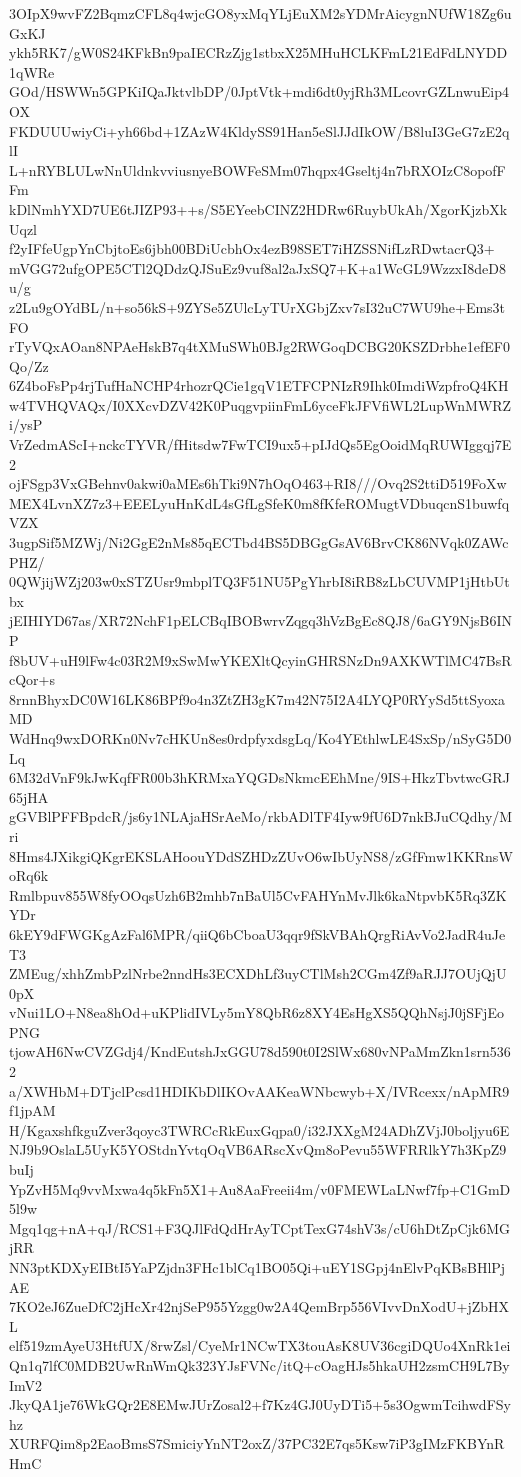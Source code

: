 3OIpX9wvFZ2BqmzCFL8q4wjcGO8yxMqYLjEuXM2sYDMrAicygnNUfW18Zg6uGxKJ
ykh5RK7/gW0S24KFkBn9paIECRzZjg1stbxX25MHuHCLKFmL21EdFdLNYDD1qWRe
GOd/HSWWn5GPKiIQaJktvlbDP/0JptVtk+mdi6dt0yjRh3MLcovrGZLnwuEip4OX
FKDUUUwiyCi+yh66bd+1ZAzW4KldySS91Han5eSlJJdIkOW/B8luI3GeG7zE2qlI
L+nRYBLULwNnUldnkvviusnyeBOWFeSMm07hqpx4Gseltj4n7bRXOIzC8opofFFm
kDlNmhYXD7UE6tJIZP93++s/S5EYeebCINZ2HDRw6RuybUkAh/XgorKjzbXkUqzl
f2yIFfeUgpYnCbjtoEs6jbh00BDiUcbhOx4ezB98SET7iHZSSNifLzRDwtacrQ3+
mVGG72ufgOPE5CTl2QDdzQJSuEz9vuf8al2aJxSQ7+K+a1WcGL9WzzxI8deD8u/g
z2Lu9gOYdBL/n+so56kS+9ZYSe5ZUlcLyTUrXGbjZxv7sI32uC7WU9he+Ems3tFO
rTyVQxAOan8NPAeHskB7q4tXMuSWh0BJg2RWGoqDCBG20KSZDrbhe1efEF0Qo/Zz
6Z4boFsPp4rjTufHaNCHP4rhozrQCie1gqV1ETFCPNIzR9Ihk0ImdiWzpfroQ4KH
w4TVHQVAQx/I0XXcvDZV42K0PuqgvpiinFmL6yceFkJFVfiWL2LupWnMWRZi/ysP
VrZedmAScI+nckcTYVR/fHitsdw7FwTCI9ux5+pIJdQs5EgOoidMqRUWIggqj7E2
ojFSgp3VxGBehnv0akwi0aMEs6hTki9N7hOqO463+RI8///Ovq2S2ttiD519FoXw
MEX4LvnXZ7z3+EEELyuHnKdL4sGfLgSfeK0m8fKfeROMugtVDbuqcnS1buwfqVZX
3ugpSif5MZWj/Ni2GgE2nMs85qECTbd4BS5DBGgGsAV6BrvCK86NVqk0ZAWcPHZ/
0QWjijWZj203w0xSTZUsr9mbplTQ3F51NU5PgYhrbI8iRB8zLbCUVMP1jHtbUtbx
jEIHIYD67as/XR72NchF1pELCBqIBOBwrvZqgq3hVzBgEc8QJ8/6aGY9NjsB6INP
f8bUV+uH9lFw4c03R2M9xSwMwYKEXltQcyinGHRSNzDn9AXKWTlMC47BsRcQor+s
8rnnBhyxDC0W16LK86BPf9o4n3ZtZH3gK7m42N75I2A4LYQP0RYySd5ttSyoxaMD
WdHnq9wxDORKn0Nv7cHKUn8es0rdpfyxdsgLq/Ko4YEthlwLE4SxSp/nSyG5D0Lq
6M32dVnF9kJwKqfFR00b3hKRMxaYQGDsNkmcEEhMne/9IS+HkzTbvtwcGRJ65jHA
gGVBlPFFBpdcR/js6y1NLAjaHSrAeMo/rkbADlTF4Iyw9fU6D7nkBJuCQdhy/Mri
8Hms4JXikgiQKgrEKSLAHoouYDdSZHDzZUvO6wIbUyNS8/zGfFmw1KKRnsWoRq6k
Rmlbpuv855W8fyOOqsUzh6B2mhb7nBaUl5CvFAHYnMvJlk6kaNtpvbK5Rq3ZKYDr
6kEY9dFWGKgAzFal6MPR/qiiQ6bCboaU3qqr9fSkVBAhQrgRiAvVo2JadR4uJeT3
ZMEug/xhhZmbPzlNrbe2nndHs3ECXDhLf3uyCTlMsh2CGm4Zf9aRJJ7OUjQjU0pX
vNui1LO+N8ea8hOd+uKPlidIVLy5mY8QbR6z8XY4EsHgXS5QQhNsjJ0jSFjEoPNG
tjowAH6NwCVZGdj4/KndEutshJxGGU78d590t0I2SlWx680vNPaMmZkn1srn5362
a/XWHbM+DTjclPcsd1HDIKbDlIKOvAAKeaWNbcwyb+X/IVRcexx/nApMR9f1jpAM
H/KgaxshfkguZver3qoyc3TWRCcRkEuxGqpa0/i32JXXgM24ADhZVjJ0boljyu6E
NJ9b9OslaL5UyK5YOStdnYvtqOqVB6ARscXvQm8oPevu55WFRRlkY7h3KpZ9buIj
YpZvH5Mq9vvMxwa4q5kFn5X1+Au8AaFreeii4m/v0FMEWLaLNwf7fp+C1GmD5l9w
Mgq1qg+nA+qJ/RCS1+F3QJlFdQdHrAyTCptTexG74shV3s/cU6hDtZpCjk6MGjRR
NN3ptKDXyEIBtI5YaPZjdn3FHc1blCq1BO05Qi+uEY1SGpj4nElvPqKBsBHlPjAE
7KO2eJ6ZueDfC2jHcXr42njSeP955Yzgg0w2A4QemBrp556VIvvDnXodU+jZbHXL
elf519zmAyeU3HtfUX/8rwZsl/CyeMr1NCwTX3touAsK8UV36cgiDQUo4XnRk1ei
Qn1q7lfC0MDB2UwRnWmQk323YJsFVNc/itQ+cOagHJs5hkaUH2zsmCH9L7ByImV2
JkyQA1je76WkGQr2E8EMwJUrZosal2+f7Kz4GJ0UyDTi5+5s3OgwmTcihwdFSyhz
XURFQim8p2EaoBmsS7SmiciyYnNT2oxZ/37PC32E7qs5Ksw7iP3gIMzFKBYnRHmC

